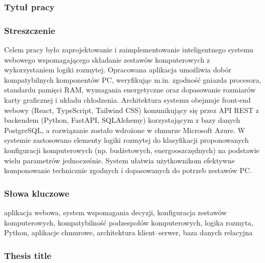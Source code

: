 \documentclass[a4paper,twoside,12pt]{book}
\begin{document}


\cleardoublepage

\rmfamily\normalfont
\pagestyle{empty}



\subsubsection*{Tytuł pracy} 
\Title

\subsubsection*{Streszczenie}  
Celem pracy było zaprojektowanie i zaimplementowanie inteligentnego systemu webowego wspomagającego składanie zestawów komputerowych z wykorzystaniem logiki rozmytej. Opracowana aplikacja umożliwia dobór kompatybilnych komponentów PC, weryfikując m.in. zgodność gniazda procesora, standardu pamięci RAM, wymagania energetyczne oraz dopasowanie rozmiarów karty graficznej i układu chłodzenia. Architektura systemu obejmuje front-end webowy (React, TypeScript, Tailwind CSS) komunikujący się przez API REST z backendem (Python, FastAPI, SQLAlchemy) korzystającym z bazy danych PostgreSQL, a rozwiązanie zostało wdrożone w chmurze Microsoft Azure. W systemie zastosowano elementy logiki rozmytej do klasyfikacji proponowanych konfiguracji komputerowych (np. budżetowych, energooszczędnych) na podstawie wielu parametrów jednocześnie. System ułatwia użytkownikom efektywne komponowanie technicznie zgodnych i dopasowanych do potrzeb zestawów PC.

\subsubsection*{Słowa kluczowe} 
aplikacja webowa, system wspomagania decyzji, konfiguracja zestawów komputerowych, kompatybilność podzespołów komputerowych, logika rozmyta, Python, aplikacje chmurowe, architektura klient–serwer, baza danych relacyjna

\subsubsection*{Thesis title} 
\begin{otherlanguage}{british}
\TitleAlt
\end{otherlanguage}
\end{document}
